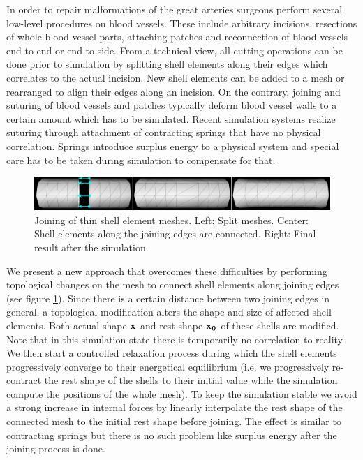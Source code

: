 In order to repair malformations of the great arteries surgeons perform several low-level procedures on blood vessels. These include arbitrary incisions, resections of whole blood vessel parts, attaching patches and reconnection of blood vessels end-to-end or end-to-side. From a technical view, all cutting operations can be done prior to simulation by splitting shell elements along their edges which correlates to the actual incision. New shell elements can be added to a mesh or rearranged to align their edges along an incision. On the contrary, joining and suturing of blood vessels and patches typically deform blood vessel walls to a certain amount which has to be simulated. Recent simulation systems \cite{Sorensen2006,Mosegaard2004,Li2009} realize suturing through attachment of contracting springs that have no physical correlation. Springs introduce surplus energy to a physical system and special care has to be taken during simulation to compensate for that.

\begin{figure}[tbh]
\begin{center}
\includegraphics[width=\columnwidth]{img/new-joining.png}
\end{center}
\caption{Joining of thin shell element meshes. Left: Split meshes. Center: Shell elements along the joining edges are connected. Right: Final result after the simulation.}
\label{fig-JoiningVessels}
\end{figure}

We present a new approach that overcomes these difficulties by performing topological changes on the mesh to connect shell elements along joining edges (see figure \ref{fig-JoiningVessels}). Since there is a certain distance between two joining edges in general, a topological modification alters the shape and size of affected shell elements. 
Both actual shape $\mathbf{x}$ and rest shape $\mathbf{x_0}$ of these shells are modified.
Note that in this simulation state there is temporarily no correlation to reality. 
We then start a controlled relaxation process during which the shell elements progressively converge to their energetical equilibrium
(i.e. we progressively re-contract the rest shape of the shells to their initial value while the simulation compute the positions of the whole mesh).
To keep the simulation stable we avoid a strong increase in internal forces by linearly interpolate the rest shape of the connected mesh to the initial rest shape before joining. 
The effect is similar to contracting springs but there is no such problem like surplus energy after the joining process is done.


